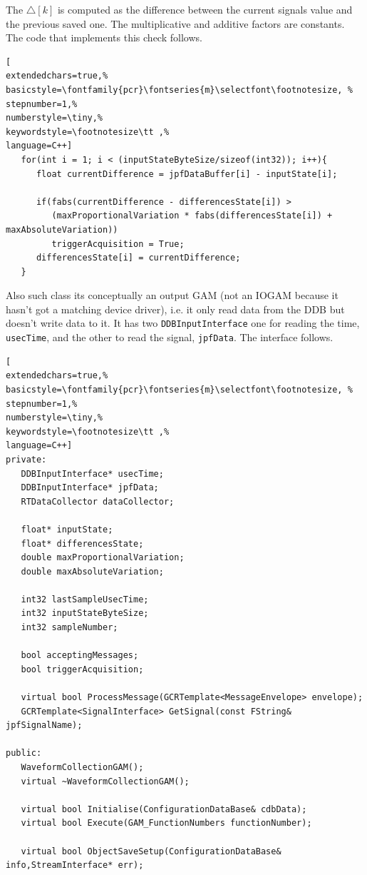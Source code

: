 The $\triangle [k]$ is computed as the difference between the current signals value and the previous saved one. The multiplicative and additive factors are constants. The code that implements this check follows.
\begin{lstlisting}[
extendedchars=true,%
basicstyle=\fontfamily{pcr}\fontseries{m}\selectfont\footnotesize, %
stepnumber=1,%
numberstyle=\tiny,%
keywordstyle=\footnotesize\tt ,%
language=C++]
   for(int i = 1; i < (inputStateByteSize/sizeof(int32)); i++){
      float currentDifference = jpfDataBuffer[i] - inputState[i];

      if(fabs(currentDifference - differencesState[i]) >
         (maxProportionalVariation * fabs(differencesState[i]) + maxAbsoluteVariation))
         triggerAcquisition = True;
      differencesState[i] = currentDifference;
   }
\end{lstlisting}

Also such class its conceptually an output GAM (not an IOGAM because it hasn't got a matching device driver), i.e. it only read data from the DDB but doesn't write data to it. It has two \texttt{DDBInputInterface} one for reading the time, \texttt{usecTime}, and the other to read the signal, \texttt{jpfData}. The interface follows. \\

\begin{lstlisting}[
extendedchars=true,%
basicstyle=\fontfamily{pcr}\fontseries{m}\selectfont\footnotesize, %
stepnumber=1,%
numberstyle=\tiny,%
keywordstyle=\footnotesize\tt ,%
language=C++]
private:
   DDBInputInterface* usecTime;
   DDBInputInterface* jpfData;
   RTDataCollector dataCollector;

   float* inputState;
   float* differencesState;
   double maxProportionalVariation;
   double maxAbsoluteVariation;

   int32 lastSampleUsecTime;
   int32 inputStateByteSize;
   int32 sampleNumber;

   bool acceptingMessages;
   bool triggerAcquisition;

   virtual bool ProcessMessage(GCRTemplate<MessageEnvelope> envelope);
   GCRTemplate<SignalInterface> GetSignal(const FString& jpfSignalName);

public:
   WaveformCollectionGAM();
   virtual ~WaveformCollectionGAM();

   virtual bool Initialise(ConfigurationDataBase& cdbData);
   virtual bool Execute(GAM_FunctionNumbers functionNumber);

   virtual bool ObjectSaveSetup(ConfigurationDataBase& info,StreamInterface* err);
\end{lstlisting}



